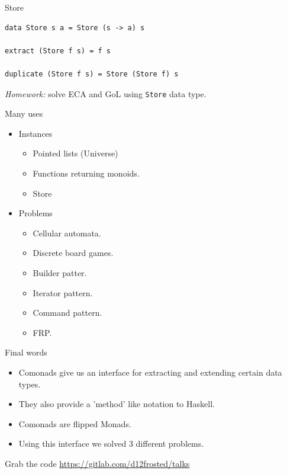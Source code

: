 \documentclass[presentation,aspectratio=169,smaller]{beamer}
\begin{document}
\begin{frame}[label={sec:org96ff442},fragile]{Store}
 \begin{verbatim}
data Store s a = Store (s -> a) s

extract (Store f s) = f s

duplicate (Store f s) = Store (Store f) s
\end{verbatim}

\pause

\emph{Homework:} solve ECA and GoL using \texttt{Store} data type.
\end{frame}

\begin{frame}[label={sec:org14dce87}]{Many uses}
\begin{itemize}
\item <1-> Instances
\begin{itemize}
\item Pointed lists (Universe)
\item Functions returning monoids.
\item Store
\end{itemize}
\item <2-> Problems
\begin{itemize}
\item Cellular automata.
\item Discrete board games.
\item Builder patter.
\item Iterator pattern.
\item Command pattern.
\item FRP.
\end{itemize}
\end{itemize}
\end{frame}

\begin{frame}[label={sec:orgfafb35f}]{Final words}
\begin{itemize}
\item <1-> Comonads give us an interface for extracting and extending certain data
types.
\item <2-> They also provide a 'method' like notation to Haskell.
\item <3-> Comonads are flipped Monads.
\item <4-> Using this interface we solved 3 different problems.
\end{itemize}
\end{frame}

\begin{frame}[label={sec:org67d0f64}]{Grab the code}
\url{https://gitlab.com/d12frosted/talks}
\end{frame}
\end{document}
